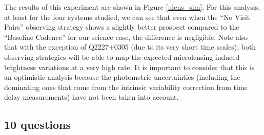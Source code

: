 The results of this experiment are shown in Figure \ref{ulens_sim}. For this analysis, at least for the four systems studied, we can see that even when the ``No Visit Pairs'' observing strategy shows a slightly better prospect compared to the ``Baseline Cadence'' for our science case, the difference is negligible. Note also that with the exception of Q2227+0305 (due to its very short time scales), both observing strategies will be able to map the expected microlensing induced brightness variations at a very high rate. It is important to consider that this is an optimistic analysis because the photometric uncertainties (including the dominating ones that come from the intrinsic variability correction from time delay measurements) have not been taken into account.

\subsection{10 questions}
\label{sec:\secname:questions}

